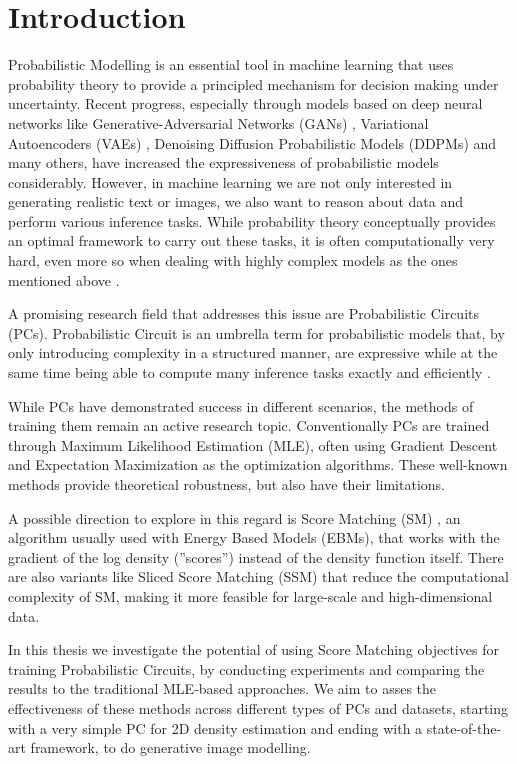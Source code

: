 \chapter{Introduction}
\label{cha:introduction}


Probabilistic Modelling is an essential tool in machine learning that uses probability theory to provide a 
principled mechanism for decision making under uncertainty. Recent progress, especially through models based on deep neural networks like Generative-Adversarial
Networks (GANs) \cite{gan}, Variational Autoencoders (VAEs) \cite{vae}, Denoising Diffusion Probabilistic Models (DDPMs) \cite{ddpm} and many others, have increased the expressiveness of probabilistic models considerably. 
However, in machine learning we are not only interested in generating realistic text or images, 
we also want to reason about data and perform various inference tasks. While probability theory conceptually provides 
an optimal framework to carry out these tasks, it is often computationally very hard, even more so when dealing 
with highly complex models as the ones mentioned above \cite{pc_intro}.

A promising research field that addresses this issue are Probabilistic Circuits (PCs). Probabilistic 
Circuit is an umbrella term for probabilistic models that, by only introducing 
complexity in a structured manner, are expressive while at the same time 
being able to compute many inference tasks exactly and efficiently \cite{pc_intro}.

While PCs have demonstrated success in different scenarios, the methods of training them remain 
an active research topic. Conventionally PCs are trained through Maximum Likelihood Estimation (MLE), often 
using Gradient Descent and Expectation Maximization as the optimization algorithms. These well-known methods
provide theoretical robustness, but also have their limitations.

A possible direction to explore in this regard is Score Matching (SM) \cite{sm}, an algorithm usually used 
with Energy Based Models (EBMs), that works with the gradient of the log density (''scores'') instead 
of the density function itself. There are also variants like Sliced Score Matching (SSM) \cite{ssm} that reduce
the computational complexity of SM, making it more feasible for large-scale and high-dimensional data. 

In this thesis we investigate the potential of using Score Matching objectives for training Probabilistic Circuits,
by conducting experiments and comparing the results to the traditional MLE-based approaches. 
We aim to asses the effectiveness of these methods across different types of PCs and datasets, starting with 
a very simple PC for 2D density estimation and ending with a state-of-the-art framework, to do generative image modelling. 